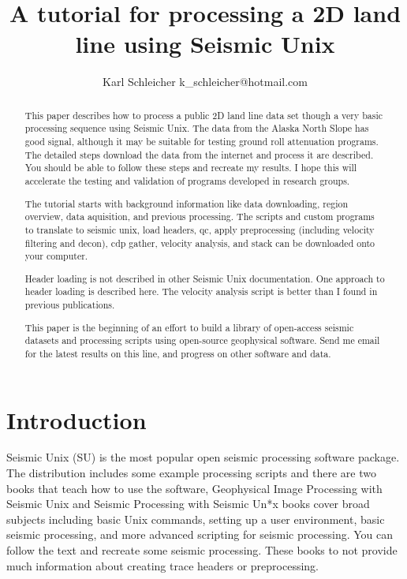 \title{A tutorial for processing a 2D land line using Seismic Unix}                                           %
\author{Karl Schleicher k\_schleicher@hotmail.com}

\maketitle

\begin{abstract}
This paper describes how to process a public 2D land line data set
though a very basic processing sequence using Seismic Unix. The data
from the Alaska North Slope has good signal, although it may be
suitable for testing ground roll attenuation programs.  The detailed
steps download the data from the internet and process it are
described.  You should be able to follow these steps and recreate my
results.  I hope this will accelerate the testing and validation of
programs developed in research groups.
\par
The tutorial starts with background information like data downloading,
region overview, data aquisition, and previous processing.  The
scripts and custom programs to translate to seismic unix, load
headers, qc, apply preprocessing (including velocity filtering and
decon), cdp gather, velocity analysis, and stack can be downloaded
onto your computer.

Header loading is not described in other Seismic Unix documentation.
One approach to header loading is described here.  The velocity
analysis script is better than I found in previous publications.

This paper is the beginning of an effort to build a library of
open-access seismic datasets and processing scripts using open-source
geophysical software. Send me email for the latest results on this line,
and progress on other software and data.
\end{abstract}

\section{Introduction}
Seismic Unix (SU) is the most popular open seismic processing 
software package.  The distribution includes some example processing
scripts and there are two books that teach how to use the software,
Geophysical Image Processing with Seismic Unix \cite[]{stockwell} and
Seismic Processing with Seismic Un*x \cite[]{forel} books cover broad
subjects including basic Unix commands, setting up a user environment,
basic seismic processing, and more advanced scripting for seismic
processing.  You can follow the text and recreate some seismic
processing.  These books to not provide much information about
creating trace headers or preprocessing.\nocite{cohen}

